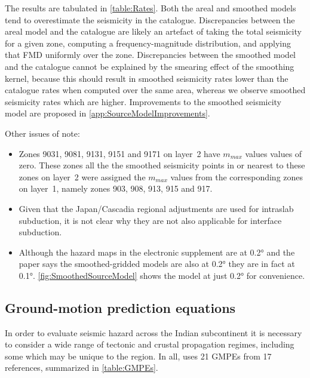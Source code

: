 \documentclass{article}
\begin{document}
The results are tabulated in \autoref{table:Rates}.
Both the areal and smoothed models tend to overestimate the seismicity in the catalogue.
Discrepancies between the areal model and the catalogue are likely an artefact of taking the total seismicity for a given zone, computing a frequency-magnitude distribution, and applying that FMD uniformly over the zone.
Discrepancies between the smoothed model and the catalogue cannot be explained by the smearing effect of the smoothing kernel, because this should result in smoothed seismicity rates lower than the catalogue rates when computed over the same area, whereas we observe smoothed seismicity rates which are higher.
Improvements to the smoothed seismicity model are proposed in \autoref{app:SourceModelImprovements}.

Other issues of note:
\begin{itemize}
\item Zones 9031, 9081, 9131, 9151 and 9171 on layer~2 have $m_{max}$ values values of zero.
These zones all the the smoothed seismicity points in or nearest to these zones on layer~2 were assigned the $m_{max}$ values from the corresponding zones on layer~1, namely zones 903, 908, 913, 915 and 917.
\item Given that the Japan/Cascadia regional adjustments are used for intraslab subduction, it is not clear why they are not also applicable for interface subduction.
\item Although the hazard maps in the electronic supplement are at 0.2° and the paper says the smoothed-gridded models are also at 0.2° they are in fact at 0.1°.
\autoref{fig:SmoothedSourceModel} shows the model at just 0.2° for convenience.
\end{itemize}

\subsection{Ground-motion prediction equations}
\label{subsec:GMPEs}

In order to evaluate seismic hazard across the Indian subcontinent it is necessary to consider a wide range of tectonic and crustal propagation regimes, including some which may be unique to the region. 
In all, \cite{nath2012probabilistic} uses 21 GMPEs from 17 references, summarized in \autoref{table:GMPEs}. 
\end{document}
